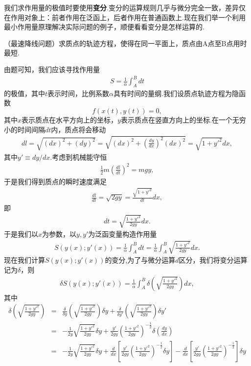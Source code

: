 		我们求作用量的极值时要使用\textbf{变分}.变分的运算规则几乎与微分完全一致，差异仅在作用对象上：前者作用在泛函上，后者作用在普通函数上.现在我们举一个利用最小作用量原理解决实际问题的例子，顺便看看变分是怎样运算的.
		\begin{example}
			（最速降线问题）求质点的轨迹方程，使得在同一平面上，质点由A点至B点用时最短.
			
			由题可知，我们应该寻找作用量
			\begin{eqnarray*}
				S=\frac{1}{\alpha}\int^B_A dt
			\end{eqnarray*}
			的极值，其中$t$表示时间，比例系数$\alpha$具有时间的量纲.我们设质点轨迹方程为隐函数$$f(x(t),y(t))=0,$$其中$x$表示质点在水平方向上的坐标，$y$表示质点在竖直方向上的坐标.在一个无穷小的时间间隔$dt$内，质点将会移动
			\begin{eqnarray*}
				dl=\sqrt{(dx)^2+(dy)^2}=\sqrt{(dx)^2+\left(\frac{dy}{dx}\right)^2(dx)^2}=\sqrt{1+y'^2}dx,
			\end{eqnarray*}
			其中$y'\equiv dy/dx$.考虑到机械能守恒
			\begin{eqnarray*}
				\frac{1}{2}m\left(\frac{dl}{dt}\right)^2=mgy,
			\end{eqnarray*}
			于是我们得到质点的瞬时速度满足
			\begin{eqnarray*}
				\frac{dl}{dt}=\sqrt{2gy}=\frac{\sqrt{1+y'^2}}{dt}dx,
			\end{eqnarray*}
			即
			\begin{eqnarray*}
				dt=\sqrt{\frac{1+y'^2}{2gy}}dx.
			\end{eqnarray*}
			于是我们以$x$为参数，以$y,y'$为泛函变量构造作用量
			\begin{eqnarray*}
				S(y(x);y'(x))=\frac{1}{\alpha}\int^B_Adt=\frac{1}{\alpha}\int^B_A\sqrt{\frac{1+y'^2}{2gy}}dx.
			\end{eqnarray*}
			现在我们计算$S(y(x);y'(x))$的变分,为了与微分运算$d$区分，我们将变分运算记为$\delta$，则
			\begin{eqnarray*}
				\delta S(y(x);y'(x))=\frac{1}{\alpha}\int^B_A\delta\left(\sqrt{\frac{1+y'^2}{2gy}}\right)dx,
			\end{eqnarray*}
			其中
			\begin{eqnarray*}
				\delta\left(\sqrt{\frac{1+y'^2}{2gy}}\right)&=&\frac{\delta}{\delta y}\left(\sqrt{\frac{1+y'^2}{2gy}}\right)\delta y+\frac{\delta}{\delta y'}\left(\sqrt{\frac{1+y'^2}{2gy}}\right)\delta y'\\
				&=&-\frac{1}{2y}\sqrt{\frac{1+y'^2}{2gy}}\delta y+\frac{y'}{2gy}\left(\frac{1+y'^2}{2gy}\right)^{-\frac{1}{2}}\delta \left(\frac{dy}{dx}\right)\\
				&=&-\frac{1}{2y}\sqrt{\frac{1+y'^2}{2gy}}\delta y+\frac{d}{dx}\left[\frac{y'}{2gy}\left(\frac{1+y'^2}{2gy}\right)^{-\frac{1}{2}}\delta y\right]-\frac{d}{dx}\left[\frac{y'}{2gy}\left(\frac{1+y'^2}{2gy}\right)^{-\frac{1}{2}}\right]\delta y\\
			\end{eqnarray*}
		\end{example}
		
